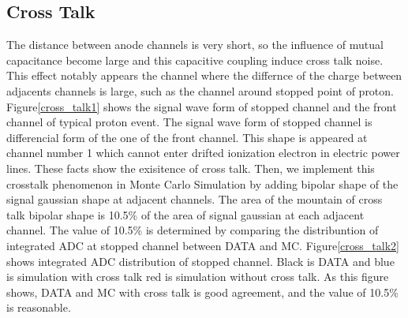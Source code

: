 \subsection{Cross Talk}

The distance between anode channels is very short,
so the influence of mutual capacitance become large
and this capacitive coupling induce cross talk noise.
This effect notably appears the channel where the differnce of the charge between adjacents channels is large, such as the channel around stopped point of proton.
Figure\ref{cross_talk1} shows the signal wave form of stopped channel and the front channel of typical proton event.
The signal wave form of stopped channel is differencial form of the one of the front channel.
This shape is appeared at channel number 1 which cannot enter drifted ionization electron in electric power lines.
These facts show the exisitence of cross talk.
Then, we implement this crosstalk phenomenon in Monte Carlo Simulation
by adding bipolar shape of the signal gaussian shape at adjacent channels.
The area of the mountain of cross talk bipolar shape is 10.5\% of the area of signal gaussian at each adjacent channel.
The value of 10.5\% is determined by comparing the distribuntion of integrated ADC at stopped channel between DATA and MC.
Figure\ref{cross_talk2} shows integrated ADC distribution of stopped channel.
Black is DATA and blue is simulation with cross talk red is simulation without cross talk.
As this figure shows, DATA and MC with cross talk is good agreement,
and the value of 10.5\% is reasonable.

